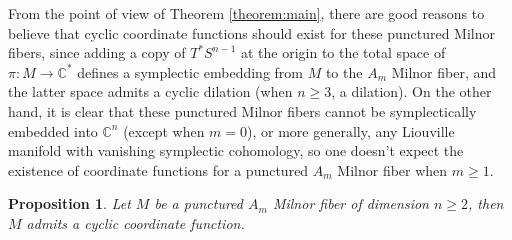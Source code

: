 \documentclass[a4paper]{article}
\newtheorem{proposition}[theorem]{Proposition}
\numberwithin{equation}{section}
\begin{document}
From the point of view of Theorem \ref{theorem:main}, there are good reasons to believe that cyclic coordinate functions should exist for these punctured Milnor fibers, since adding a copy of $T^\ast S^{n-1}$ at the origin to the total space of $\pi:M\rightarrow\mathbb{C}^\ast$ defines a symplectic embedding from $M$ to the $A_m$ Milnor fiber, and the latter space admits a cyclic dilation (when $n\geq3$, a dilation). On the other hand, it is clear that these punctured Milnor fibers cannot be symplectically embedded into $\mathbb{C}^n$ (except when $m=0$), or more generally, any Liouville manifold with vanishing symplectic cohomology, so one doesn't expect the existence of coordinate functions for a punctured $A_m$ Milnor fiber when $m\geq1$.

\begin{proposition}
Let $M$ be a punctured $A_m$ Milnor fiber of dimension $n\geq2$, then $M$ admits a cyclic coordinate function.
\end{proposition}
\end{document}
